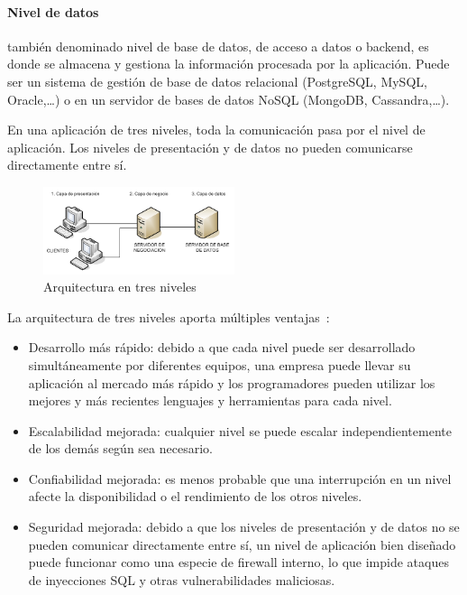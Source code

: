 \paragraph{Nivel de datos} también denominado nivel de base de datos, de acceso a datos o backend, es donde se almacena y gestiona la información procesada por la aplicación. Puede ser un sistema de gestión de base de datos relacional (PostgreSQL, MySQL, Oracle,\dots) o en un servidor de bases de datos NoSQL (MongoDB, Cassandra,\dots). 


En una aplicación de tres niveles, toda la comunicación pasa por el nivel de aplicación. Los niveles de presentación y de datos no pueden comunicarse directamente entre sí.

\begin{figure}[H]
  \centering
  \includegraphics[width=0.50\textwidth]{imaxes/arquitectura-3-niveles.png}
  \caption{Arquitectura en tres niveles}
  \label{fig:arquitectura-3-niveles}
\end{figure}


La arquitectura de tres niveles aporta múltiples ventajas~\cite{ibmMVC}:

\begin{itemize}
\item Desarrollo más rápido: debido a que cada nivel puede ser desarrollado simultáneamente por diferentes equipos, una empresa puede llevar su aplicación al mercado más rápido y los programadores pueden utilizar los mejores y más recientes lenguajes y herramientas para cada nivel.
\item Escalabilidad mejorada: cualquier nivel se puede escalar independientemente de los demás según sea necesario.
\item Confiabilidad mejorada: es menos probable que una interrupción en un nivel afecte la disponibilidad o el rendimiento de los otros niveles.
\item Seguridad mejorada: debido a que los niveles de presentación y de datos no se pueden comunicar directamente entre sí, un nivel de aplicación bien diseñado puede funcionar como una especie de firewall interno, lo que impide ataques de inyecciones SQL y otras vulnerabilidades maliciosas.
\end{itemize}


